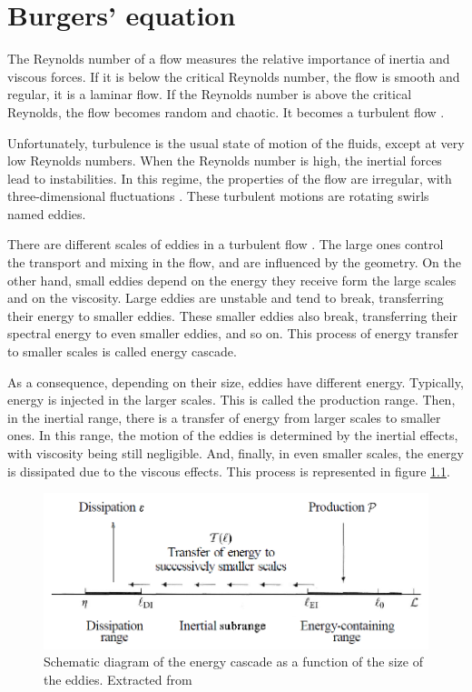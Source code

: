 \chapter{Burgers' equation}
The Reynolds number of a flow measures the relative importance of inertia and viscous forces. If it is below the critical Reynolds number, the flow is smooth and regular, it is a laminar flow. If the Reynolds number is above the critical Reynolds, the flow becomes random and chaotic. It becomes a turbulent flow \cite{Versteeg2007}.

Unfortunately, turbulence is the usual state of motion of the fluids, except at very low Reynolds numbers. When the Reynolds number is high, the inertial forces lead to instabilities. In this regime, the properties of the flow are irregular, with three-dimensional fluctuations \cite{CTTCb}. These turbulent motions are rotating swirls named eddies.

There are different scales of eddies in a turbulent flow \cite{Pope2000}. The large ones control the transport and mixing in the flow, and are influenced by the geometry. On the other hand, small eddies depend on the energy they receive form the large scales and on the viscosity. Large eddies are unstable and tend to break, transferring their energy to smaller eddies. These smaller eddies also break, transferring their spectral energy to even smaller eddies, and so on. This process of energy transfer to smaller scales is called energy cascade.

As a consequence, depending on their size, eddies have different energy. Typically, energy is injected in the larger scales. This is called the production range. Then, in the inertial range, there is a transfer of energy from larger scales to smaller ones. In this range, the motion of the eddies is determined by the inertial effects, with viscosity being still negligible. And, finally, in even smaller scales, the energy is dissipated due to the viscous effects. This process is represented in figure \ref{energylength}.

\begin{figure}
	\centering
	\includegraphics[scale=0.6]{Burgers/energylength}
	\caption[Schematic diagram of the energy cascade as a function of the size of the eddies]{Schematic diagram of the energy cascade as a function of the size of the eddies. Extracted from \cite{Pope2000}}
	\label{energylength}
\end{figure}

